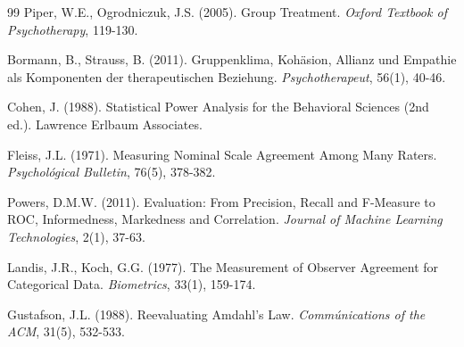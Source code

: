 \documentclass[12pt,a4paper,twoside]{book}
\begin{document}
\begin{thebibliography}{99}
Piper, W.E., Ogrodniczuk, J.S. (2005).
Group Treatment.
\textit{Oxford Textbook of Psychotherapy}, 119-130.

Bormann, B., Strauss, B. (2011).
Gruppenklima, Kohäsion, Allianz und Empathie als Komponenten der therapeutischen Beziehung.
\textit{Psychotherapeut}, 56(1), 40-46.

Cohen, J. (1988).
Statistical Power Analysis for the Behavioral Sciences (2nd ed.).
Lawrence Erlbaum Associates.

Fleiss, J.L. (1971).
Measuring Nominal Scale Agreement Among Many Raters.
\textit{Psychológical Bulletin}, 76(5), 378-382.

Powers, D.M.W. (2011).
Evaluation: From Precision, Recall and F-Measure to ROC, Informedness, Markedness and Correlation.
\textit{Journal of Machine Learning Technologies}, 2(1), 37-63.

Landis, J.R., Koch, G.G. (1977).
The Measurement of Observer Agreement for Categorical Data.
\textit{Biometrics}, 33(1), 159-174.

Gustafson, J.L. (1988).
Reevaluating Amdahl's Law.
\textit{Commúnications of the ACM}, 31(5), 532-533.

\end{thebibliography}
\end{document}
